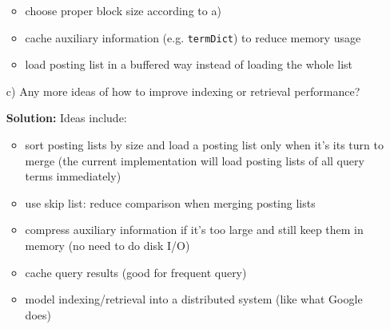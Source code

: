 \documentclass{article}
\begin{document}
\begin{itemize}
\begin{itemize}
    \item choose proper block size according to a)
    
    \item cache auxiliary information (e.g. {\texttt{termDict}}) to reduce
    memory usage
    
    \item load posting list in a buffered way instead of loading the whole
    list
  \end{itemize}
  \item[c)] Any more ideas of how to improve indexing or retrieval performance?
  
  \textbf{Solution:} Ideas include:
  \begin{itemize}
    \item sort posting lists by size and load a posting list only when it's
    its turn to merge (the current implementation will load posting lists of
    all query terms immediately)
    
    \item use skip list: reduce comparison when merging posting lists
    
    \item compress auxiliary information if it's too large and still keep them
    in memory (no need to do disk I/O)
    
    \item cache query results (good for frequent query)
    
    \item model indexing/retrieval into a distributed system (like what Google
    does)
  \end{itemize}
\end{itemize}
\end{document}
